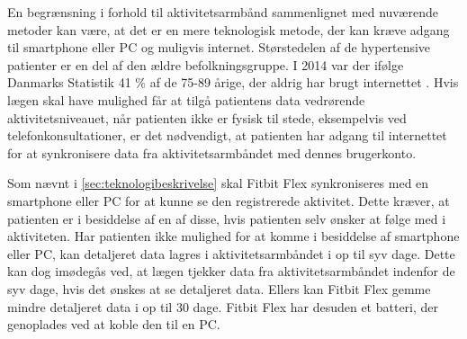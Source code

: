 En begrænsning i forhold til aktivitetsarmbånd sammenlignet med nuværende metoder kan være, at det er en mere teknologisk metode, der kan kræve adgang til smartphone eller PC og muligvis internet. Størstedelen af de hypertensive patienter er en del af den ældre befolkningsgruppe. I 2014 var der ifølge Danmarks Statistik 41 \% af de 75-89 årige, der aldrig har brugt internettet \citep{dst2014}. Hvis lægen skal have mulighed får at tilgå patientens data vedrørende aktivitetsniveauet, når patienten ikke er fysisk til stede, eksempelvis ved telefonkonsultationer, er det nødvendigt, at patienten har adgang til internettet for at synkronisere data fra aktivitetsarmbåndet med dennes brugerkonto.

Som nævnt i \autoref{sec:teknologibeskrivelse} skal Fitbit Flex synkroniseres med en smartphone eller PC for at kunne se den registrerede aktivitet. Dette kræver, at patienten er i besiddelse af en af disse, hvis patienten selv ønsker at følge med i aktiviteten. Har patienten ikke mulighed for at komme i besiddelse af smartphone eller PC, kan detaljeret data lagres i aktivitetsarmbåndet i op til syv dage. Dette kan dog imødegås ved, at lægen tjekker data fra aktivitetsarmbåndet indenfor de syv dage, hvis det ønskes at se detaljeret data. Ellers kan Fitbit Flex gemme mindre detaljeret data i op til 30 dage. Fitbit Flex har desuden et batteri, der genoplades ved at koble den til en PC. 
